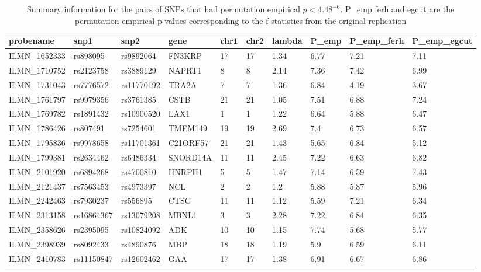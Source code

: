 \documentclass[paper=a4, fontsize=11pt]{scrartcl}         %
\numberwithin{equation}{section}                  %
\numberwithin{figure}{section}                    %
\numberwithin{table}{section}                   %
\begin{document}
\begin{landscape}

\begin{table}[ht]
\centering
\begin{tabular}{llllllllll}
  \hline
 probename & snp1 & snp2 & gene & chr1 & chr2 & lambda & P\_emp & P\_emp\_ferh & P\_emp\_egcut \\ 
  \hline
ILMN\_1652333 & rs898095 & rs9892064 & FN3KRP & 17 & 17 & 1.34 & 6.77 & 7.21 & 7.11 \\ 
ILMN\_1710752 & rs2123758 & rs3889129 & NAPRT1 & 8 & 8 & 2.14 & 7.36 & 7.42 & 6.99 \\ 
  ILMN\_1731043 & rs7776572 & rs11770192 & TRA2A & 7 & 7 & 1.36 & 6.84 & 4.19 & 3.67 \\ 
  ILMN\_1761797 & rs9979356 & rs3761385 & CSTB & 21 & 21 & 1.05 & 7.51 & 6.88 & 7.24 \\ 
  ILMN\_1769782 & rs1891432 & rs10900520 & LAX1 & 1 & 1 & 1.22 & 6.64 & 5.88 & 6.47 \\ 
  ILMN\_1786426 & rs807491 & rs7254601 & TMEM149 & 19 & 19 & 2.69 & 7.4 & 6.73 & 6.57 \\ 
  ILMN\_1795836 & rs9978658 & rs11701361 & C21ORF57 & 21 & 21 & 1.43 & 5.65 & 6.84 & 5.12 \\ 
  ILMN\_1799381 & rs2634462 & rs6486334 & SNORD14A & 11 & 11 & 2.45 & 7.22 & 6.63 & 6.82 \\ 
  ILMN\_2101920 & rs6894268 & rs4700810 & HNRPH1 & 5 & 5 & 1.47 & 7.14 & 6.59 & 7.43 \\ 
  ILMN\_2121437 & rs7563453 & rs4973397 & NCL & 2 & 2 & 1.2 & 5.88 & 5.87 & 5.96 \\ 
  ILMN\_2242463 & rs7930237 & rs556895 & CTSC & 11 & 11 & 1.12 & 5.59 & 7.21 & 6.34 \\ 
  ILMN\_2313158 & rs16864367 & rs13079208 & MBNL1 & 3 & 3 & 2.28 & 7.22 & 6.84 & 6.35 \\ 
  ILMN\_2358626 & rs2395095 & rs10824092 & ADK & 10 & 10 & 1.15 & 7.74 & 5.68 & 5.77 \\ 
  ILMN\_2398939 & rs8092433 & rs4890876 & MBP & 18 & 18 & 1.19 & 5.9 & 6.59 & 6.11 \\ 
  ILMN\_2410783 & rs11150847 & rs12602462 & GAA & 17 & 17 & 1.38 & 6.91 & 6.67 & 6.86 \\ 
   \hline
\end{tabular}
\caption*{Summary information for the pairs of SNPs that had permutation empirical $p<4.48^{-6}$. P\_emp ferh and egcut are the permutation empirical p-values corresponding to the f-statistics from the original replication}

\end{table}
\end{landscape}
\end{document}
